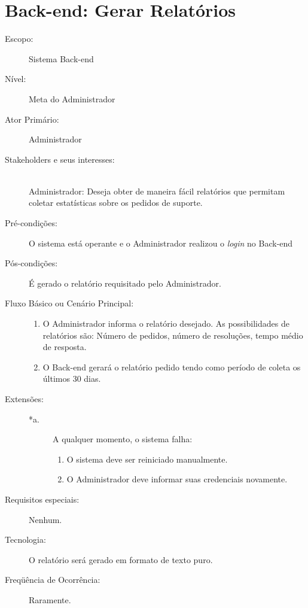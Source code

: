 \documentclass[brazil,times]{abnt}
\begin{document}
\section{Back-end: Gerar Relatórios}
\begin{description}
\item[Escopo:] Sistema Back-end
\item[Nível:] Meta do Administrador
\item[Ator Primário:] Administrador
\item[Stakeholders e seus interesses:] \hfill \\
Administrador: Deseja obter de maneira fácil relatórios que permitam coletar
estatísticas sobre os pedidos de suporte.

\item[Pré-condições:] O sistema está operante e o Administrador realizou o \emph{login}
no Back-end
\item[Pós-condições:]  É gerado o relatório requisitado pelo Administrador.
\item[Fluxo Básico ou Cenário Principal:]\hfill
\begin{enumerate}
  \item O Administrador informa o relatório desejado. As possibilidades de
  relatórios são: Número de pedidos, número de resoluções, tempo médio de
  resposta.
  \item O Back-end gerará o relatório pedido tendo como período de coleta os
  últimos 30 dias.
\end{enumerate}

\item[Extensões:]\hfill
\begin{description}
	\item[*a.] A qualquer momento, o sistema falha: \hfill
	\begin{enumerate}
 		\item O sistema deve ser reiniciado manualmente.
 		\item O Administrador deve informar suas credenciais novamente.
	\end{enumerate} 
\end{description}
\item[Requisitos especiais:] Nenhum.
\item[Tecnologia:] O relatório será gerado em formato de texto puro.
\item[Freqüência de Ocorrência:] Raramente.

\end{description}
\end{document}
